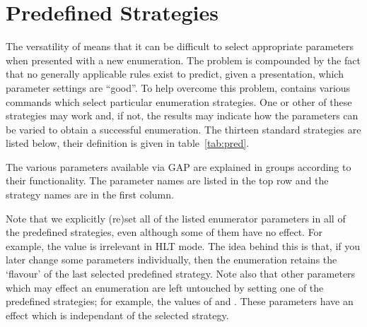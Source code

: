 \section{Predefined Strategies}\label{sec:strat}

The versatility of {\ace} means that it can be difficult to select appropriate
parameters when presented with a new enumeration.  The problem is compounded
by the fact that no generally applicable rules exist to predict, given a
presentation, which parameter settings are ``good''.  To help overcome this
problem, {\ace} contains various commands which select particular enumeration
strategies.  One or other of these strategies may work and, if not, the
results may indicate how the parameters can be varied to obtain a successful
enumeration.  The thirteen standard strategies are listed below, their
definition is given in table~\ref{tab:pred}.

The various parameters available via \textsf{GAP} are explained in groups
according to their functionality. The parameter names are listed in the top
row and the strategy names are in the first column.

Note that we explicitly (re)set all of the listed enumerator parameters in
  all of the predefined strategies, even although some of them have no
  effect.
For example, the  value is irrelevant in HLT mode.
The idea behind this is that, if you later change some parameters
  individually, then the enumeration retains the `flavour' of the last
  selected predefined strategy.
Note also that other parameters which may effect an enumeration are left
  untouched by setting one of the predefined strategies; for example, the
  values of  and .
These parameters have an effect which is independant of the selected 
  strategy.

